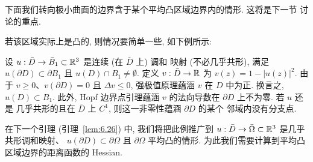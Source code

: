 下面我们转向极小曲面的边界含于某个平均凸区域边界内的情形. 这将是下一节
讨论的重点.

若该区域实际上是凸的, 则情况要简单一些, 如下例所示:

\begin{example}
\label{ex:6.25}
设 $u:\bar{D}\to\bar{B}_1\subset\mathbb{R}^3$ 是连续 (在 $\bar{D}$ 上) 调和
映射 (不必几乎共形), 满足 $u(\partial D)\subset\partial B_1$ 且
$u(D)\cap B_1\neq\emptyset$. 定义 $v:\bar{D}\to\mathbb{R}$ 为
$v(z)=1-|u(z)|^2$. 由于 $v\geq0$、$v(\partial D)=0$ 且 $\Delta v\leq0$,
强极值原理蕴涵 $v$ 在 $D$ 中为正. 换言之, $u(D)\subset B_1$. 此外,
Hopf 边界点引理蕴涵 $v$ 的法向导数在 $\partial D$ 上不为零. 若 $u$ 还是
几乎共形的且在 $\bar{D}$ 上 $C^1$, 则这一非零性蕴涵 $\partial D$ 的某个
邻域内没有分支点.
\end{example}

在下一个引理 (引理~\ref{lem:6.26}) 中, 我们将把此例推广到
$u:\bar{D}\to\bar{\Omega}\subset\mathbb{R}^3$ 是几乎共形调和映射、
$u(\partial D)\subset\partial\Omega$ 且 $\partial\Omega$ 平均凸的情形.
为此我们需要计算到平均凸区域边界的距离函数的 Hessian.

